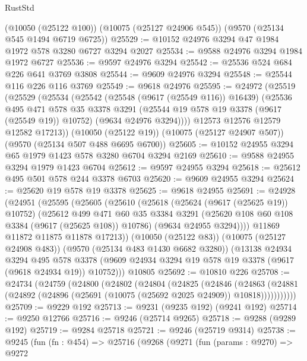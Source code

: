 \begin{lexlean}{RustStd}
\begin{coremodule}
    (@10050 (@25122 @100))
    (@10075 (@25127 @24906 @545))
    (@9570 (@25134 @545 @1494 @6719 @6725))
@25529 := @10152 @24976 @3294 @47 @1984 @1972 @578 @3280 @6727 @3294 @2027
@25534 := @9588 @24976 @3294 @1984 @1972 @6727
@25536 := @9597 @24976 @3294
@25542 := @25536 @524 @684 @226 @641 @3769 @3808
@25544 := @9609 @24976 @3294
@25548 := @25544 @116 @226 @116 @3769
@25549 := @9618 @24976
@25595 := @24972
    (@25519
      (@25529
        (@25534
          (@25542
            (@25548 (@9617 (@25549 @116)) @16439)
            (@25536
              @495
              @471
              @578
              @35
              @3378
              @3291
              (@25544 @19 @578 @19 @3378 (@9617 (@25549 @19)) @10752)
              (@9634 @24976 @3294))))
        @12573
        @12576
        @12579
        @12582
        @17213))
    (@10050 (@25122 @19))
    (@10075 (@25127 @24907 @507))
    (@9570 (@25134 @507 @488 @6695 @6700))
@25605 := @10152 @24955 @3294 @65 @1979 @1423 @578 @3280 @6704 @3294 @2169
@25610 := @9588 @24955 @3294 @1979 @1423 @6704
@25612 := @9597 @24955 @3294
@25618 := @25612 @495 @501 @578 @244 @3378 @6703
@25620 := @9609 @24955 @3294
@25624 := @25620 @19 @578 @19 @3378
@25625 := @9618 @24955
@25691 := @24928
    (@24951
      (@25595
        (@25605
          (@25610
            (@25618
              (@25624 (@9617 (@25625 @19)) @10752)
              (@25612
                @499
                @471
                @60
                @35
                @3384
                @3291
                (@25620 @108 @60 @108 @3384 (@9617 (@25625 @108)) @10786)
                (@9634 @24955 @3294))))
          @11869
          @11872
          @11875
          @11878
          @17213))
      (@10050 (@25122 @83))
      (@10075 (@25127 @24908 @483))
      (@9570 (@25134 @483 @1430 @6682 @3280))
      (@13138
        @24934
        @3294
        @495
        @578
        @3378
        (@9609 @24934 @3294 @19 @578 @19 @3378 (@9617 (@9618 @24934 @19)) @10752)))
    @10805
@25692 := @10810 @226
@25708 := @24734
    (@24759
      (@24800
        (@24802
          (@24804
            (@24825
              (@24846
                (@24863
                  (@24881 (@24892 (@24896 (@25691 (@10075 (@25692 @2025 @24909)) @10818)))))))))))
@25709 := @9229 @192
@25713 := @9231 (@9235 @192) (@9241 @192)
@25714 := @9250 @12766
@25716 := @9246 (@25714 @9265)
@25718 := @9288 (@9289 @192)
@25719 := @9284 @25718
@25721 := @9246 (@25719 @9314)
@25738 := @9245
    (fun (fn : @454) =>
    @25716
      (@9268
        (@9271
          (fun (params : @9270) =>
          @9272

\end{coremodule}
\end{lexlean}
